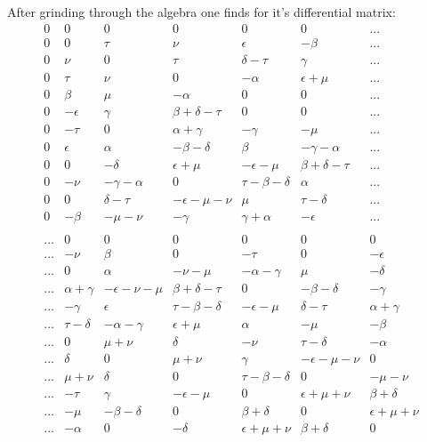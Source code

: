 \documentclass[12pt]{article}
\begin{document}
 After grinding through the algebra one finds for it's differential
matrix:
\begin{displaymath}
\begin{array}{ccccccc}
0 & 0 & 0 & 0 & 0 & 0 & ... \\
0 & 0 & \tau & \nu & \epsilon & -\beta & ... \\
0 & \nu & 0 & \tau & \delta-\tau& \gamma & ... \\
0 & \tau & \nu & 0 & -\alpha & \epsilon+\mu & ... \\
0 & \beta & \mu & -\alpha & 0 & 0 & ... \\
0 & -\epsilon & \gamma & \beta+\delta-\tau & 0 & 0 & ... \\
0 & -\tau & 0 & \alpha+\gamma & -\gamma & -\mu & ... \\
0 & \epsilon & \alpha & -\beta-\delta & \beta & -\gamma-\alpha &... \\
0 & 0 & -\delta & \epsilon+\mu & -\epsilon-\mu & \beta+\delta-\tau & ... \\
0 & -\nu & -\gamma-\alpha & 0 & \tau-\beta-\delta & \alpha & ... \\
0 & 0 & \delta-\tau & -\epsilon-\mu-\nu & \mu & \tau-\delta & ... \\
0 & -\beta & -\mu-\nu & -\gamma & \gamma+\alpha & -\epsilon & ... \\
& & & & & & \\
... & 0 & 0 & 0 & 0 & 0 & 0 \\
... & -\nu & \beta & 0 & -\tau & 0 & -\epsilon \\
... & 0 & \alpha & -\nu-\mu & -\alpha-\gamma & \mu & -\delta \\
...& \alpha+\gamma & -\epsilon-\nu-\mu & \beta+\delta-\tau & 0 & -\beta-\delta & -\gamma \\
... & -\gamma & \epsilon & \tau-\beta-\delta & -\epsilon-\mu & \delta-\tau & \alpha+\gamma \\
...&  \tau-\delta & -\alpha-\gamma& \epsilon+\mu & \alpha & -\mu & -\beta \\
... & 0 & \mu+\nu & \delta & -\nu & \tau-\delta & -\alpha \\
... & \delta & 0 & \mu+\nu & \gamma & -\epsilon-\mu-\nu & 0 \\
... & \mu+\nu & \delta & 0 & \tau-\beta-\delta & 0 & -\mu-\nu \\
... & -\tau & \gamma & -\epsilon-\mu & 0 & \epsilon+\mu+\nu & \beta+\delta \\
... & -\mu & -\beta-\delta & 0 & \beta+\delta & 0 & \epsilon+\mu+\nu \\
... &  -\alpha & 0 & -\delta & \epsilon+\mu+\nu & \beta+\delta & 0 
\end{array}
\end{displaymath}
\end{document}

